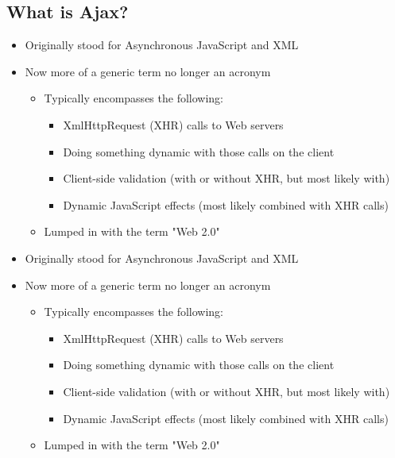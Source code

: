 \begin{ifhtml}
\begin{s5slide}
        \section{What is Ajax?}
            \begin{itemize}
                \item Originally stood for Asynchronous JavaScript and XML
                \item Now more of a generic term no longer an acronym
                \begin{itemize}
                    \item Typically encompasses the following:
                    \begin{itemize}
                        \item XmlHttpRequest (XHR) calls to Web servers 
                        \item Doing something dynamic with those calls on the client
                        \item Client-side validation (with or without XHR, but most likely with)
                        \item Dynamic JavaScript effects (most likely combined with XHR calls)
                    \end{itemize}
                    \item Lumped in with the term "Web 2.0"
                \end{itemize}
            \end{itemize}
            \begin{s5notes}
                \begin{itemize}
                    \item Originally stood for Asynchronous JavaScript and XML
                    \item Now more of a generic term no longer an acronym
                    \begin{itemize}
                        \item Typically encompasses the following:
                        \begin{itemize}
                            \item XmlHttpRequest (XHR) calls to Web servers 
                            \item Doing something dynamic with those calls on the client
                            \item Client-side validation (with or without XHR, but most likely with)
                            \item Dynamic JavaScript effects (most likely combined with XHR calls)
                        \end{itemize}
                        \item Lumped in with the term "Web 2.0"
                    \end{itemize}
                \end{itemize}
            \end{s5notes}
    \end{s5slide}
    \begin{s5slide}

\end{s5slide}
\end{ifhtml}
